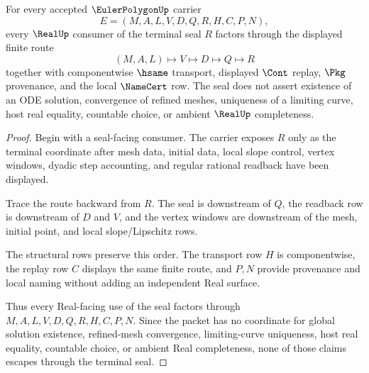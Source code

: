 \begin{theorem}
\label{thm:euler-polygon-real-seal-nonescape}
For every accepted $\EulerPolygonUp$ carrier
$$
E=(M,A,L,V,D,Q,R,H,C,P,N),
$$
every $\RealUp$ consumer of the terminal seal $R$ factors through the displayed finite route
$$
(M,A,L)\longmapsto V\longmapsto D\longmapsto Q\longmapsto R
$$
together with componentwise $\hsame$ transport, displayed $\Cont$ replay, $\Pkg$ provenance, and the local $\NameCert$ row. The seal does not assert existence of an ODE solution, convergence of refined meshes, uniqueness of a limiting curve, host real equality, countable choice, or ambient $\RealUp$ completeness.
\end{theorem}
\begin{proof}
Begin with a seal-facing consumer. The carrier exposes $R$ only as the terminal coordinate after mesh data, initial data, local slope control, vertex windows, dyadic step accounting, and regular rational readback have been displayed.

Trace the route backward from $R$. The seal is downstream of $Q$, the readback row is downstream of $D$ and $V$, and the vertex windows are downstream of the mesh, initial point, and local slope/Lipschitz rows.

The structural rows preserve this order. The transport row $H$ is componentwise, the replay row $C$ displays the same finite route, and $P,N$ provide provenance and local naming without adding an independent Real surface.

Thus every Real-facing use of the seal factors through $M,A,L,V,D,Q,R,H,C,P,N$. Since the packet has no coordinate for global solution existence, refined-mesh convergence, limiting-curve uniqueness, host real equality, countable choice, or ambient Real completeness, none of those claims escapes through the terminal seal.
\end{proof}



